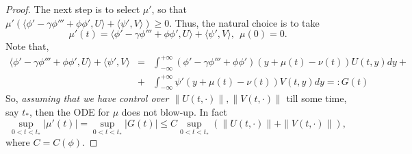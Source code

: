 \documentclass[10pt,a4paper]{amsart}
\newcommand{\dpr}[2]{\langle #1,#2 \rangle}
\newcommand{\ga}{\gamma}
\begin{document}
\begin{proof}
 The next step is to select $\mu'$, so that $\mu'\left(\dpr{\phi'-\ga \phi'''+  \phi\phi'}{U} +\dpr{\psi'}{V}\right)\ge 0$. Thus, the natural choice  is to take  
 \begin{equation}
 	\label{300}
 	\mu'(t)= \dpr{\phi'-\ga \phi'''+  \phi\phi'}{U} +\dpr{\psi'}{V}, \ \ \mu(0)=0. 
 \end{equation}
% 		
 Note that, 
 	\begin{eqnarray*}
 \dpr{\phi'-\ga \phi'''+  \phi\phi'}{U} +\dpr{\psi'}{V} &=&  \int_{-\infty}^{+\infty} (\phi'-\ga \phi'''+\phi\phi')(y+\mu(t)-\nu(t)) U(t,y) dy +  \\
 &+& 
\int_{-\infty}^{+\infty}  \psi'(y+\mu(t)-\nu(t)) V(t, y) dy=:G(t)
	\end{eqnarray*}
So, {\it assuming that we have control over $\|U(t, \cdot)\|, \|V(t, \cdot)\|$} till some time, say $t_*$, then the ODE for $\mu$ does not blow-up. In fact 
\begin{equation}
	\label{3001}
	\sup_{0<t<t_*}|\mu'(t)|=\sup_{0<t<t_*} |G(t)|\leq C \sup_{0<t<t_*}(\|U(t, \cdot)\|+ \|V(t, \cdot)\|),
\end{equation}
where $C=C(\phi)$. 


\end{proof}
\end{document}
